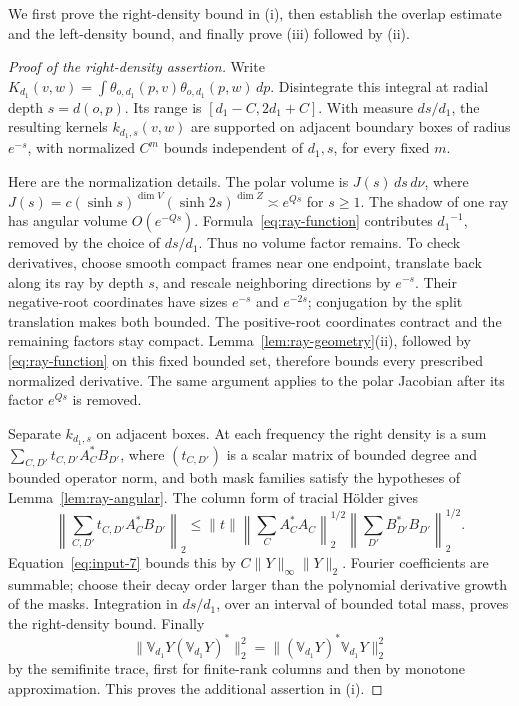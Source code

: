 We first prove the right-density bound in (i), then establish the overlap
estimate and the left-density bound, and finally prove (iii) followed by
(ii).

\begin{proof}[Proof of the right-density assertion]
Write
\(K_{d_1}(v,w)=\int\theta_{o,d_1}(p,v)\theta_{o,d_1}(p,w)\,dp\).
Disintegrate this integral at radial depth \(s=d(o,p)\).  Its range
is \([{d_1}-C,2{d_1}+C]\).  With measure \(ds/{d_1}\), the resulting kernels
\(k_{d_1,s}(v,w)\) are supported on adjacent boundary boxes of radius
\(e^{-s}\), with normalized \(C^m\) bounds independent of \({d_1},s\),
for every fixed \(m\).

Here are the normalization details.  The polar volume is
\(J(s)\,ds\,d\nu\), where
\(J(s)=c(\sinh s)^{\dim V}(\sinh2s)^{\dim Z}\asymp e^{Qs}\)
for \(s\ge1\).  The shadow of one ray has angular volume
\(O(e^{-Qs})\).  Formula~\eqref{eq:ray-function} contributes
\({d_1}^{-1}\), removed by the choice of \(ds/{d_1}\).  Thus no volume
factor remains.  To check derivatives, choose smooth compact frames
near one endpoint, translate back along its ray by depth \(s\), and
rescale neighboring directions by \(e^{-s}\).  Their negative-root
coordinates have sizes \(e^{-s}\) and \(e^{-2s}\); conjugation by
the split translation makes both bounded.  The positive-root
coordinates contract and the remaining factors stay compact.
Lemma~\ref{lem:ray-geometry}(ii), followed by
\eqref{eq:ray-function} on this fixed bounded set, therefore
bounds every prescribed normalized derivative.  The same argument
applies to the polar Jacobian after its factor \(e^{Qs}\) is removed.

Separate \(k_{d_1,s}\) on adjacent boxes.  At each frequency the right
density is a sum \(\sum_{C,D'}t_{C,D'}A_C^*B_{D'}\), where
\((t_{C,D'})\) is a scalar matrix of bounded degree and bounded
operator norm, and both mask families satisfy the hypotheses of
Lemma~\ref{lem:ray-angular}.  The column form of tracial
H\"older gives
\[
 \left\|\sum_{C,D'}t_{C,D'}A_C^*B_{D'}\right\|_2
 \le \|t\|
 \left\|\sum_C A_C^*A_C\right\|_2^{1/2}
 \left\|\sum_{D'}B_{D'}^*B_{D'}\right\|_2^{1/2}.
\]
Equation~\eqref{eq:input-7} bounds this by
\(C\|Y\|_\infty\|Y\|_2\).  Fourier coefficients are summable;
choose their decay order larger than the polynomial derivative
growth of the masks.  Integration in \(ds/{d_1}\), over an interval of
bounded total mass, proves the right-density bound.  Finally
\[
 \|\mathbb V_{d_1}Y(\mathbb V_{d_1}Y)^*\|_2^2
 =\| (\mathbb V_{d_1}Y)^*\mathbb V_{d_1}Y\|_2^2
\]
by the semifinite trace, first for finite-rank columns and then by
monotone approximation.  This proves the additional assertion in (i).
\end{proof}

